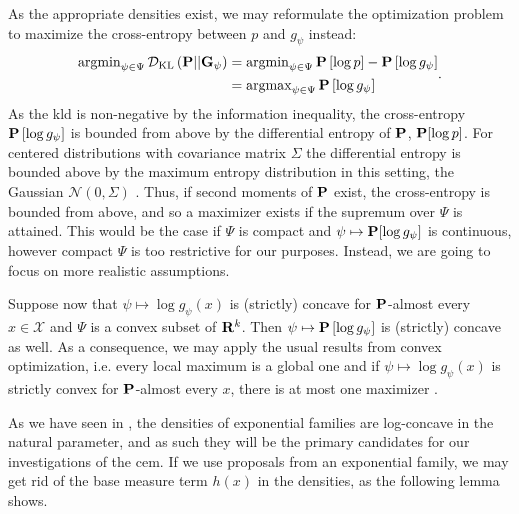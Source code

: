 As the appropriate densities exist, we may reformulate the optimization problem to maximize the cross-entropy between $p$ and $g_{\psi}$ instead:
\begin{align}
    \begin{split}
    \argmin_{\psi \in \Psi} \Dkl{\P}{\G_{\psi}} &=  \argmin_{\psi \in \Psi} \P \left[\log p \right] - \P \left[\log g_{\psi}\right] \\
    &= \argmax_{\psi \in \Psi} \P \left[\log g_{\psi}\right]
    \end{split} \label{eq:ce_argmax}.
\end{align}
As the \acrshort{kld} is non-negative by the information inequality, the cross-entropy $\P \left[ \log g_{\psi} \right]$ is bounded from above by the differential entropy of $\P$, $\P [\log p]$. For centered distributions with covariance matrix $\Sigma$ the differential entropy is bounded above by the maximum entropy distribution in this setting, the Gaussian $\mathcal N(0, \Sigma)$ \citep[Example 12.2.8]{Cover2006Elements}. Thus, if second moments of $\P$ exist, the cross-entropy is bounded from above, and so a maximizer exists if the supremum over $\Psi$ is attained. This would be the case if $\Psi$ is compact and $\psi \mapsto \P [\log g_{\psi}]$ is continuous, however compact $\Psi$ is too restrictive for our purposes. Instead, we are going to focus on more realistic assumptions.

Suppose now that $\psi \mapsto \log g_{\psi}(x)$ is (strictly) concave for $\P$-almost every $x \in \mathcal X$ and $\Psi$ is a convex subset of $\R^{k}$. Then $\psi \mapsto \P \left[\log g_{\psi}\right]$ is (strictly) concave as well. As a consequence, we may apply the usual results from convex optimization, i.e. every local maximum is a global one and if $\psi \mapsto \log g_{\psi}(x)$ is strictly convex for $\P$-almost every $x$, there is at most one maximizer \citep[Theorem 3.4.2]{Bazaraa2006Nonlinear}.

As we have seen in , the densities of exponential families are log-concave in the natural parameter, and as such they will be the primary candidates for our investigations of the \acrshort{cem}. 
If we use proposals from an exponential family, we may get rid of the base measure term $h(x)$ in the densities, as the following lemma shows.

